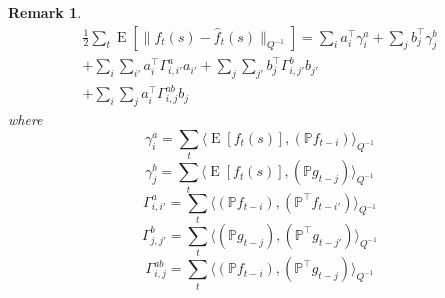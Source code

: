 \documentclass{IEEEtran}
\newcommand{\inner}[3]{\langle#1,#2\rangle_{#3}}
\newcommand{\dist}[2]{\|#1\|_{#2}}
\DeclareMathOperator{\E}{E}
\newtheorem{remark}{Remark}
\begin{document}
\begin{remark}
\begin{equation}
	\label{eqn:norm_x_error}
	\begin{split}
	\frac{1}{2}\sum_t\E[\dist{f_t(s) - \hat{f}_t(s)}{Q^{-1}}] = 
		\sum_i a_i^\top \gamma^a_i + \sum_j b_j^\top \gamma^b_j \\
		+ \sum_i\sum_{i'}a_i^\top \Gamma_{i,i'}^a
		a_{i'} 
		+ \sum_j\sum_{j'}b_j^\top \Gamma_{i,j'}^b
		b_{j'} \\
		+ \sum_i\sum_{j}a_i^\top \Gamma_{i,j}^{ab}
		b_j
		\end{split}
\end{equation}
where
\begin{equation}
	\gamma_i^a = \sum_t\inner
	{\E[f_t(s)]}
	{(\mathbb{P} f_{t-i})}
	{Q^{-1}}
\end{equation}
\begin{equation}
	\gamma_j^b = \sum_t\inner
	{\E[f_t(s)]}
	{(\mathbb{P} g_{t-j})}
	{Q^{-1}}
\end{equation}
\begin{equation}
	 \Gamma_{i,i'}^a = \sum_t \inner
		{(\mathbb{P} f_{t-i})}
		{(\mathbb{P}^\top f_{t-i'})}
		{Q^{-1}}
\end{equation}
\begin{equation}
	\Gamma_{j,j'}^b = \sum_t \inner
		{(\mathbb{P} g_{t-j})}
		{(\mathbb{P}^\top g_{t-j'})}
		{Q^{-1}}
\end{equation}
\begin{equation}
	\Gamma_{i,j}^{ab} = \sum_t \inner
		{(\mathbb{P} f_{t-i})}
		{(\mathbb{P}^\top g_{t-j})}
		{Q^{-1}}
\end{equation}


\end{remark}
\end{document}
